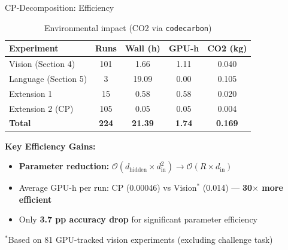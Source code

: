 \begin{frame}{CP-Decomposition: Efficiency}
    \begin{center}
        \begin{table}
            \centering
            \small
            \begin{tabular}{lcccc}
                \toprule
                Experiment & Runs & Wall (h) & GPU-h & CO2 (kg) \\
                \midrule
                Vision (Section 4) & 101 & 1.66 & 1.11 & 0.040 \\
                Language (Section 5) & 3 & 19.09 & 0.00 & 0.105 \\
                Extension 1 & 15 & 0.58 & 0.58 & 0.020 \\
                Extension 2 (CP) & 105 & 0.05 & 0.05 & 0.004 \\
                \midrule
                \textbf{Total} & \textbf{224} & \textbf{21.39} & \textbf{1.74} & \textbf{0.169} \\
                \bottomrule
            \end{tabular}
            \caption{Environmental impact (CO2 via \texttt{codecarbon})}
        \end{table}
    \end{center}
    
    \vspace{0.3cm}
    \textbf{Key Efficiency Gains:}
    \begin{itemize}
        \item \textbf{Parameter reduction:} $\mathcal{O}(d_{\text{hidden}} \times d_{\text{in}}^2) \to \mathcal{O}(R \times d_{\text{in}})$
        \item Average GPU-h per run: CP (0.00046) vs Vision$^*$ (0.014) --- \textbf{30$\times$ more efficient}
        \item Only \textbf{3.7 pp accuracy drop} for significant parameter efficiency
    \end{itemize}
    \vspace{0.2cm}
    \footnotesize{$^*$Based on 81 GPU-tracked vision experiments (excluding challenge task)}
\end{frame}

